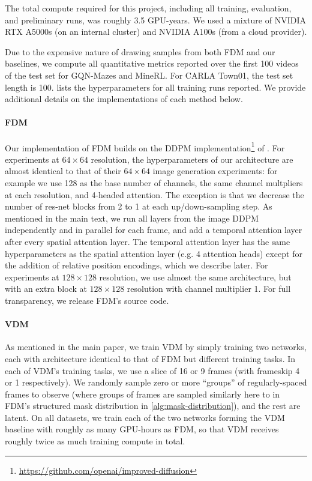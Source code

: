 The total compute required for this project, including all training, evaluation, and preliminary runs, was roughly 3.5 GPU-years. We used a mixture of NVIDIA RTX A5000s (on an internal cluster) and NVIDIA A100s (from a cloud provider).

Due to the expensive nature of drawing samples from both FDM and our baselines, we compute all quantitative metrics reported over the first 100 videos of the test set for GQN-Mazes and MineRL. For CARLA Town01, the test set length is 100.  lists the hyperparameters for all training runs reported. We provide additional details on the implementations of each method below.

\paragraph{FDM} 
Our implementation of FDM builds on the DDPM implementation\footnote{\url{https://github.com/openai/improved-diffusion}} of \citet{nichol2021improved}. For experiments at $64\times64$ resolution, the hyperparameters of our architecture are almost identical to that of their $64\times64$ image generation experiments: for example we use 128 as the base number of channels, the same channel multpliers at each resolution, and 4-headed attention. The exception is that we decrease the number of res-net blocks from 2 to 1 at each up/down-sampling step. As mentioned in the main text, we run all layers from the image DDPM independently and in parallel for each frame, and add a temporal attention layer after every spatial attention layer. The temporal attention layer has the same hyperparameters as the spatial attention layer (e.g. 4 attention heads) except for the addition of relative position encodings, which we describe later. For experiments at $128\times128$ resolution, we use almost the same architecture, but with an extra block at $128\times128$ resolution with channel multiplier 1. For full transparency, we release FDM's source code.

\paragraph{VDM}
As mentioned in the main paper, we train VDM by simply training two networks, each with architecture identical to that of FDM but different training tasks. In each of VDM's training tasks, we use a slice of 16 or 9 frames (with frameskip 4 or 1 respectively). We randomly sample zero or more ``groups'' of regularly-spaced frames to observe (where groups of frames are sampled similarly here to in FDM's structured mask distribution in \cref{alg:mask-distribution}), and the rest are latent. On all datasets, we train each of the two networks forming the VDM baseline with roughly as many GPU-hours as FDM, so that VDM receives roughly twice as much training compute in total.

